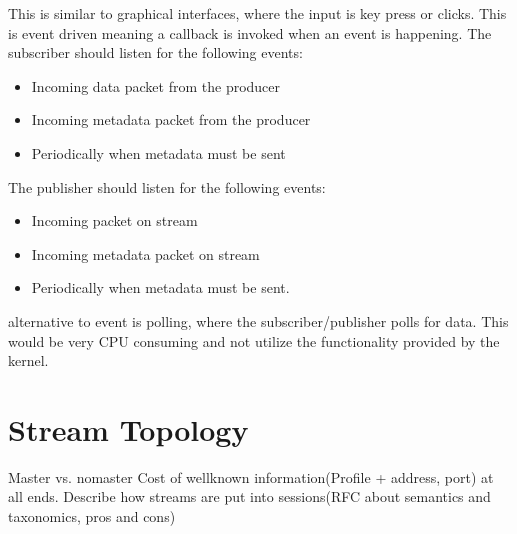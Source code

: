 This is similar to graphical interfaces, where the input is key press or clicks. This is event driven meaning a callback is invoked when an event is happening.
The subscriber should listen for the following events:
\begin{itemize}
	\item Incoming data packet from the producer
	\item Incoming metadata packet from the producer
	\item Periodically when metadata must be sent
\end{itemize}

The publisher should listen for the following events:
\begin{itemize}
	\item Incoming packet on stream
	\item Incoming metadata packet on stream
	\item Periodically when metadata must be sent.
\end{itemize}

alternative to event is polling, where the subscriber/publisher polls for data. This would be very CPU consuming and not utilize the functionality provided by the kernel.


\section{Stream Topology}

Master vs. nomaster
Cost of wellknown information(Profile + address, port) at all ends.
Describe how streams are put into sessions(RFC about semantics and taxonomics, pros and cons)

